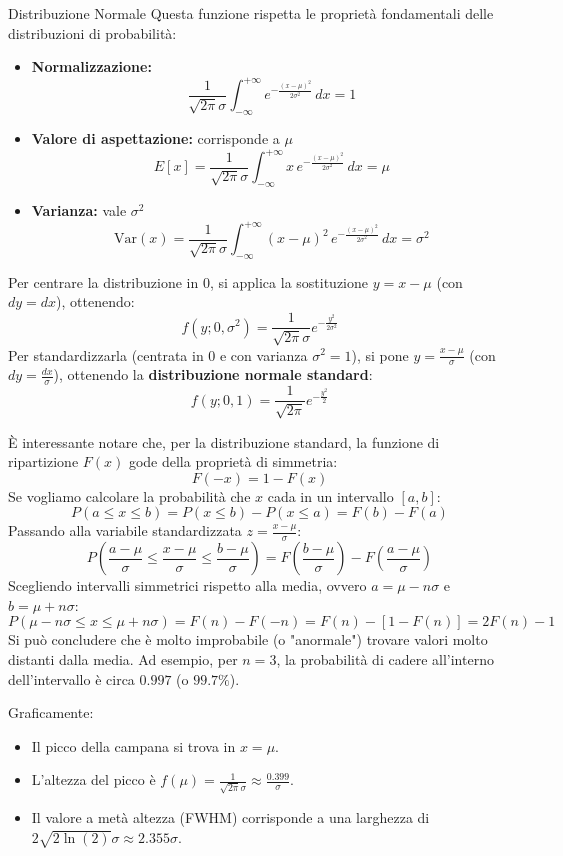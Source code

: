 \documentclass[openany,a4paper,12pt]{book}
\theoremstyle{remark}
\begin{document}
\begin{bressan}{Distribuzione Normale}
Questa funzione rispetta le proprietà fondamentali delle distribuzioni di probabilità:
\begin{itemize}
    \item \textbf{Normalizzazione:}
    \[
        \frac{1}{\sqrt{2\pi}\sigma} \int_{-\infty}^{+\infty} e^{-\frac{(x-\mu)^2}{2\sigma^2}} \, dx = 1
    \]
    \item \textbf{Valore di aspettazione:} corrisponde a $\mu$
    \[
        E[x] = \frac{1}{\sqrt{2\pi}\sigma} \int_{-\infty}^{+\infty} x \, e^{-\frac{(x-\mu)^2}{2\sigma^2}} \, dx = \mu
    \]
    \item \textbf{Varianza:} vale $\sigma^2$
    \[
        \text{Var}(x) = \frac{1}{\sqrt{2\pi}\sigma} \int_{-\infty}^{+\infty} (x - \mu)^2 \, e^{-\frac{(x-\mu)^2}{2\sigma^2}} \, dx = \sigma^2
    \]
\end{itemize}

Per centrare la distribuzione in $0$, si applica la sostituzione $y=x-\mu$ (con $dy=dx$), ottenendo:
\[
f(y; 0, \sigma^2)=\frac{1}{\sqrt{2\pi}\sigma}e^{-\frac{y^2}{2\sigma^2}}
\]
Per standardizzarla (centrata in $0$ e con varianza $\sigma^2=1$), si pone $y=\frac{x-\mu}{\sigma}$ (con $dy=\frac{dx}{\sigma}$), ottenendo la \textbf{distribuzione normale standard}:
\[
f(y; 0, 1)=\frac{1}{\sqrt{2\pi}}e^{-\frac{y^2}{2}}
\]

È interessante notare che, per la distribuzione standard, la funzione di ripartizione $F(x)$ gode della proprietà di simmetria:
\[
F(-x) = 1 - F(x)
\]
Se vogliamo calcolare la probabilità che $x$ cada in un intervallo $[a,b]$:
\[
P(a\leq x\leq b) = P(x \leq b) - P(x \leq a) = F(b) - F(a)
\]
Passando alla variabile standardizzata $z = \frac{x-\mu}{\sigma}$:
\[
P\left(\frac{a- \mu}{\sigma} \leq \frac{x- \mu}{\sigma} \leq \frac{b- \mu}{\sigma}\right) = F\left(\frac{b- \mu}{\sigma}\right) - F\left(\frac{a- \mu}{\sigma}\right)
\]
Scegliendo intervalli simmetrici rispetto alla media, ovvero $a= \mu - n\sigma$ e $b= \mu + n\sigma$:
\[
P(\mu - n\sigma \leq x \leq \mu + n\sigma) = F(n) - F(-n) = F(n) - [1 - F(n)] = 2F(n) - 1
\]
Si può concludere che è molto improbabile (o "anormale") trovare valori molto distanti dalla media. Ad esempio, per $n=3$, la probabilità di cadere all'interno dell'intervallo è circa $0.997$ (o $99.7\%$).

Graficamente:
\begin{itemize}
    \item Il picco della campana si trova in $x=\mu$.
    \item L'altezza del picco è $f(\mu) = \frac{1}{\sqrt{2\pi}\sigma} \approx \frac{0.399}{\sigma}$.
    \item Il valore a metà altezza (FWHM) corrisponde a una larghezza di $2\sqrt{2 \ln(2)}\sigma \approx 2.355\sigma$.
\end{itemize}    


\end{bressan}
\end{document}
